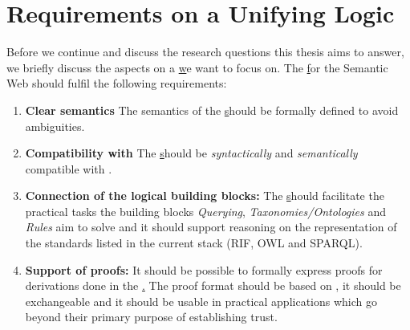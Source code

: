 \section{Requirements on a Unifying Logic}\label{req}
Before we continue and discuss the research questions this thesis aims to answer, 
we briefly discuss the aspects on a \ul we want to focus on. The \ul for the Semantic Web should fulfil the following requirements:
\begin{enumerate}
\item \textbf{Clear semantics} %
The semantics of the \ul should be formally defined to avoid ambiguities.
\item \textbf{Compatibility with \rdf} %
The \ul should be \emph{syntactically} and \emph{semantically} compatible with \rdf.
\item \textbf{Connection of the logical building blocks:} %
The \ul  should facilitate the practical tasks the 
 building blocks \emph{Querying}, \emph{Taxonomies/Ontologies}
and \emph{Rules} aim to solve and 
it should support reasoning on the \rdf representation of the standards listed in the current stack (\ie RIF, OWL and SPARQL).
\item \textbf{Support of proofs:} It should be possible to formally express proofs for derivations done in the \ul. The proof format should be based on \rdf, it should be 
exchangeable and it should be usable in practical applications which go  beyond their primary purpose of establishing trust.
\end{enumerate}

